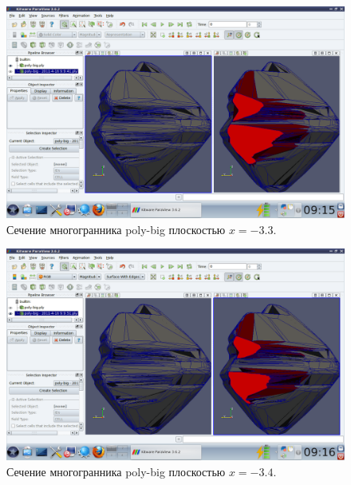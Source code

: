 \documentclass[a4paper,12pt, titlepage]{article}
\begin{document}
	\begin{flushleft}
		\begin{figure}[p]
		    \includegraphics[trim = 220 65 10 140, clip, width=15cm]{poly-big/33.png}
		    \caption{Сечение многогранника poly-big плоскостью $x = -3.3$.}
		    \label{poly-big-3}
		\end{figure}

	\end{flushleft}
	\begin{flushleft}
		\begin{figure}[p]
		    \includegraphics[trim = 220 65 10 140, clip, width=15cm]{poly-big/34.png}
		    \caption{Сечение многогранника poly-big плоскостью $x = -3.4$.}
		    \label{poly-big-4}
		\end{figure}
	\end{flushleft}
\end{document}
